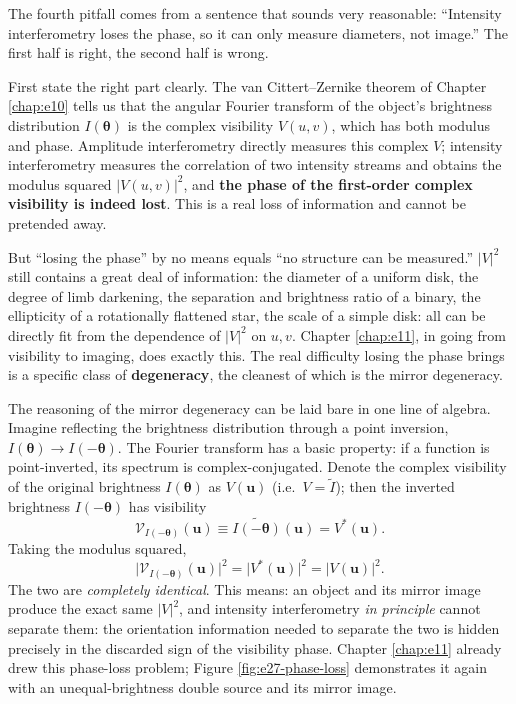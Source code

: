 The fourth pitfall comes from a sentence that sounds very reasonable: ``Intensity interferometry loses the phase, so it can only measure diameters, not image.'' The first half is right, the second half is wrong.

First state the right part clearly. The van Cittert--Zernike theorem of Chapter \ref{chap:e10} tells us that the angular Fourier transform of the object's brightness distribution \(I(\boldsymbol\theta)\) is the complex visibility \(V(u,v)\), which has both modulus and phase. Amplitude interferometry directly measures this complex \(V\); intensity interferometry measures the correlation of two intensity streams and obtains the modulus squared \(|V(u,v)|^2\), and \textbf{the phase of the first-order complex visibility is indeed lost}. This is a real loss of information and cannot be pretended away.

But ``losing the phase'' by no means equals ``no structure can be measured.'' \(|V|^2\) still contains a great deal of information: the diameter of a uniform disk, the degree of limb darkening, the separation and brightness ratio of a binary, the ellipticity of a rotationally flattened star, the scale of a simple disk: all can be directly fit from the dependence of \(|V|^2\) on \(u,v\). Chapter \ref{chap:e11}, in going from visibility to imaging, does exactly this. The real difficulty losing the phase brings is a specific class of \textbf{degeneracy}, the cleanest of which is the mirror degeneracy.

The reasoning of the mirror degeneracy can be laid bare in one line of algebra. Imagine reflecting the brightness distribution through a point inversion, \(I(\boldsymbol\theta)\to I(-\boldsymbol\theta)\). The Fourier transform has a basic property: if a function is point-inverted, its spectrum is complex-conjugated. Denote the complex visibility of the original brightness \(I(\boldsymbol\theta)\) as \(V(\boldsymbol u)\) (i.e.\ \(V=\widetilde I\)); then the inverted brightness \(I(-\boldsymbol\theta)\) has visibility
\[
  \mathcal V_{I(-\boldsymbol\theta)}(\boldsymbol u)
  \equiv\widetilde{I(-\boldsymbol\theta)}(\boldsymbol u)
  =V^\ast(\boldsymbol u).
\]
Taking the modulus squared,
\[
  \big|\mathcal V_{I(-\boldsymbol\theta)}(\boldsymbol u)\big|^2
  =\big|V^\ast(\boldsymbol u)\big|^2=\big|V(\boldsymbol u)\big|^2.
\]
The two are \emph{completely identical}. This means: an object and its mirror image produce the exact same \(|V|^2\), and intensity interferometry \emph{in principle} cannot separate them: the orientation information needed to separate the two is hidden precisely in the discarded sign of the visibility phase. Chapter \ref{chap:e11} already drew this phase-loss problem; Figure \ref{fig:e27-phase-loss} demonstrates it again with an unequal-brightness double source and its mirror image.

